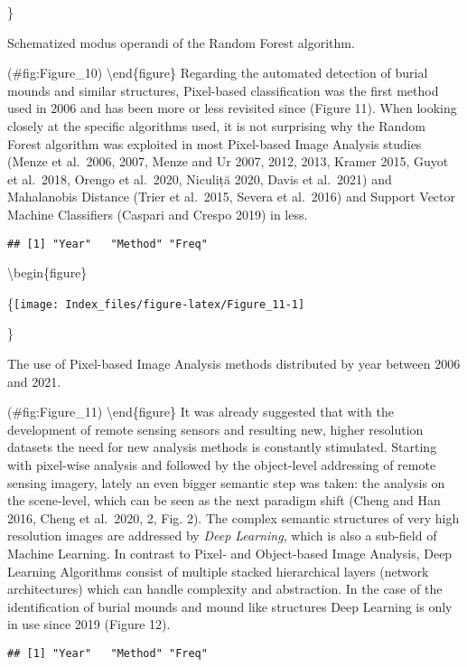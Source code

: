 \documentclass[
]{article}
\begin{document}
\}

\caption{Schematized modus operandi of the Random Forest algorithm.}

(\#fig:Figure\_10)
\textbackslash end\{figure\}
Regarding the automated detection of burial mounds and similar structures, Pixel-based classification was the first method used in 2006 and has been more or less revisited since (Figure 11). When looking closely at the specific algorithms used, it is not surprising why the Random Forest algorithm was exploited in most Pixel-based Image Analysis studies (Menze et al.~2006, 2007, Menze and Ur 2007, 2012, 2013, Kramer 2015, Guyot et al.~2018, Orengo et al.~2020, Niculiță 2020, Davis et al.~2021) and Mahalanobis Distance (Trier et al.~2015, Severa et al.~2016) and Support Vector Machine Classifiers (Caspari and Crespo 2019) in less.

\begin{verbatim}
## [1] "Year"   "Method" "Freq"
\end{verbatim}

\textbackslash begin\{figure\}

\{\centering \texttt{[image: Index\_files/figure-latex/Figure\_11-1]}

\}

\caption{The use of Pixel-based Image Analysis methods distributed by year between 2006 and 2021.}

(\#fig:Figure\_11)
\textbackslash end\{figure\}
It was already suggested that with the development of remote sensing sensors and resulting new, higher resolution datasets the need for new analysis methods is constantly stimulated. Starting with pixel-wise analysis and followed by the object-level addressing of remote sensing imagery, lately an even bigger semantic step was taken: the analysis on the scene-level, which can be seen as the next paradigm shift (Cheng and Han 2016, Cheng et al.~2020, 2, Fig. 2). The complex semantic structures of very high resolution images are addressed by \emph{Deep Learning}, which is also a sub-field of Machine Learning. In contrast to Pixel- and Object-based Image Analysis, Deep Learning Algorithms consist of multiple stacked hierarchical layers (network architectures) which can handle complexity and abstraction.
In the case of the identification of burial mounds and mound like structures Deep Learning is only in use since 2019 (Figure 12).

\begin{verbatim}
## [1] "Year"   "Method" "Freq"
\end{verbatim}
\end{document}
